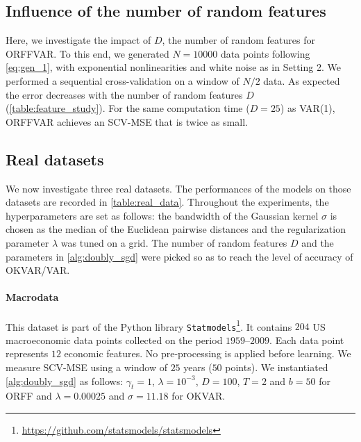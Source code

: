 \subsection{Influence of the number of random features}
Here, we investigate the impact of $D$, the number of random features for
\acs{ORFFVAR}. To this end, we generated $N=10000$ data points following
\cref{eq:gen_1}, with exponential nonlinearities and white noise as in Setting
2. We performed a sequential cross-validation on a window of $N/2$ data.  As
expected the error decreases with the number of random features $D$
(\cref{table:feature_study}). For the same computation time ($D=25$) as
\acs{VAR}(1), \acs{ORFFVAR} achieves an \acs{SCV-MSE} that is twice as small.
\begin{table}[htb]
    \centering
    \caption{SVC-MSE with respect to $D$ the number of random features for
    ORFFVAR. \label{table:feature_study}}
\end{table}
\subsection{Real datasets}
We now investigate three real datasets. The performances of the models on those
datasets are recorded in \cref{table:real_data}. Throughout the
experiments, the hyperparameters are set as follows: the bandwidth of the
Gaussian kernel $\sigma$ is chosen as the median of the Euclidean pairwise
distances and the regularization parameter $\lambda$ was tuned on a grid. The
number of random features $D$ and the parameters in \cref{alg:doubly_sgd} were
picked so as to reach the level of accuracy of \acs{OKVAR}/\acs{VAR}.

\paragraph{Macrodata}
This dataset is part of the Python library
\texttt{Statmodels}\footnote{\url{https://github.com/statsmodels/statsmodels}}.
It contains $204$ US macroeconomic data points collected on the period
$1959$--$2009$.  Each data point represents $12$ economic features. No
pre-processing is applied before learning. We measure \acs{SCV-MSE} using a
window of $25$ years ($50$ points). We instantiated \cref{alg:doubly_sgd} as
follows: $\gamma_t = 1$, $\lambda = 10^{-3}$, $D=100$, $T=2$ and $b=50$ for
ORFF and $\lambda=0.00025$ and $\sigma=11.18$ for \acs{OKVAR}.
